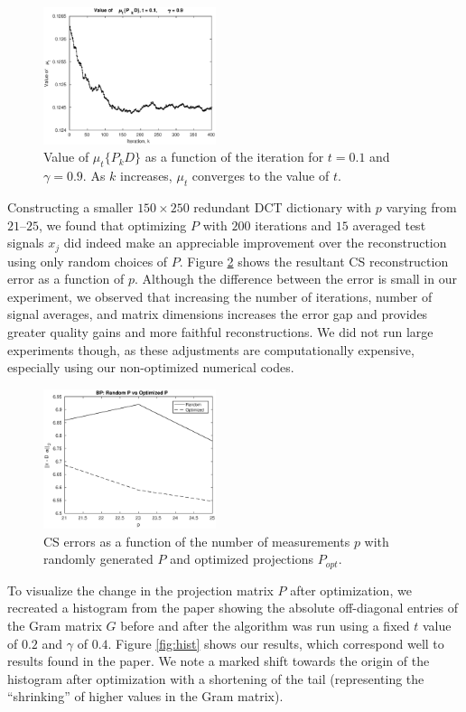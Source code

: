 \documentclass[journal]{IEEEtran}
\begin{document}
\begin{figure}[]
  \centering
  \includegraphics[width=0.45\textwidth]{mu_t_bw.eps}
  \caption{Value of $\mu_t\{P_kD\}$ as a function of the iteration for $t = 0.1$ and $\gamma = 0.9$.  As $k$ increases, $\mu_t$ converges to the value of $t$.}
  \label{fig:mu_t}
\end{figure}

Constructing a smaller $150 \times 250$ redundant DCT dictionary with $p$ varying from $21$--$25$, we found that optimizing $P$ with $200$ iterations and $15$ averaged test signals $x_j$ did indeed make an appreciable improvement over the reconstruction using only random choices of $P$.  Figure \ref{fig:err} shows the resultant CS reconstruction error as a function of $p$.  Although the difference between the error is small in our experiment, we observed that increasing the number of iterations, number of signal averages, and matrix dimensions increases the error gap and provides greater quality gains and more faithful reconstructions.  We did not run large experiments though, as these adjustments are computationally expensive, especially using our non-optimized numerical codes.

\begin{figure}[]
  \centering
  \includegraphics[width=0.45\textwidth]{rel_errors.eps}
  \caption{CS errors as a function of the number of measurements $p$ with randomly generated $P$ and optimized projections $P_{opt}$.}
  \label{fig:err}
\end{figure}

To visualize the change in the projection matrix $P$ after optimization, we recreated a histogram from the paper showing the absolute off-diagonal entries of the Gram matrix $G$ before and after the algorithm was run using a fixed $t$ value of $0.2$ and $\gamma$ of $0.4$.  Figure \ref{fig:hist} shows our results, which correspond well to results found in the paper.  We note a marked shift towards the origin of the histogram after optimization with a shortening of the tail (representing the ``shrinking'' of higher values in the Gram matrix).
\end{document}
